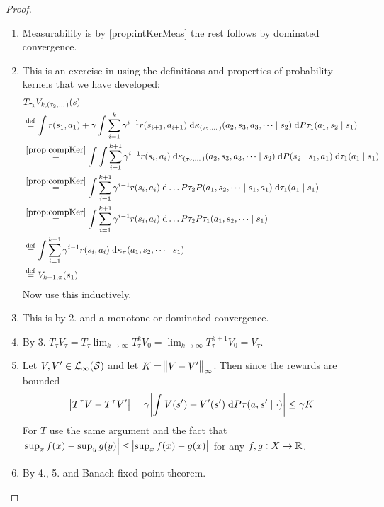\begin{proof}[Proof]
  \leavevmode
  \begin{enumerate}
    \item Measurability is by \cref{prop:intKerMeas} the rest follows by
      dominated convergence.
      \label{commLimits}
    \item This is an exercise in using the definitions and properties
      of probability kernels that we have developed:
      \begin{align*}
	& T_{\tau_1} V_{k,(\tau_2, \dots)}(s)
	\\ &\stackrel{\mathrm{def}}{=} \int r(s_1, a_1) + \gamma
	\int \sum_{i=1}^k \gamma^{i-1} r(s_{i+1}, a_{i+1})
	\; \mathrm{d} \kappa_{(\tau_2, \dots)} (a_2, s_3, a_3, \dots \mid s_2)
	\; \mathrm{d} P \tau_1(a_1, s_2 \mid s_1)
	\\ &\stackrel{\ref{prop:compKer}}{=} 
	\int \int \sum_{i=1}^{k+1} \gamma^{i-1} r(s_i, a_i)
	\; \mathrm{d} \kappa_{(\tau_2, \dots)} (a_2, s_3, a_3, \dots \mid s_2)
	\; \mathrm{d} P (s_2 \mid s_1, a_1) \; \mathrm{d} \tau_1(a_1 \mid s_1)
	\\ &\stackrel{\ref{prop:compKer}}{=} 
	\int \sum_{i=1}^{k+1} \gamma^{i-1} r(s_i, a_i)
	\; \mathrm{d} \dots P \tau_2 P(a_1, s_2, \dots \mid s_1, a_1)
	\; \mathrm{d} \tau_1(a_1 \mid s_1)
	\\ &\stackrel{\ref{prop:compKer}}{=} 
	\int \sum_{i=1}^{k+1} \gamma^{i-1} r(s_i, a_i)
	\; \mathrm{d} \dots P \tau_2 P \tau_1 (a_1, s_2, \dots \mid s_1)
	\\ &\stackrel{\mathrm{def}}{=} \int \sum_{i=1}^{k+1} \gamma^{i-1} r(s_i, a_i)
	\; \mathrm{d} \kappa_\pi (a_1, s_2, \dots \mid s_1)
	\\ &\stackrel{\mathrm{def}}{=} V_{k+1, \pi}(s_1)
      \end{align*}
      Now use this inductively.
    \item This is by 2. and a monotone or dominated convergence.
    \item By 3. $T_\tau V_\tau = T_\tau \lim_{k \to\infty} T_{\tau}^k V_0
      = \lim_{k \to\infty} T_\tau^{k+1} V_0 = V_\tau$.
    \item Let $V, V' \in \mathcal{L}_\infty(\mathcal{S})$
      and let $K = \norm{V - V'}_\infty$.
      Then since the rewards are bounded
      \[ \abs{T^\tau V - T^\tau V'}
	= \gamma \abs{\int V(s') - V'(s') \; \mathrm{d} P\tau(a, s' \mid \cdot)}
      \leq \gamma K \]
      For $T$ use the same argument and the fact that
      $\abs{\sup_x f(x) - \sup_{y} g(y)} \leq
      \abs{\sup_x f(x) - g(x)}$ for any $f,g : X \to \mathbb{R}$.
    \item By 4., 5. and Banach fixed point theorem.
  \end{enumerate}
\end{proof}

